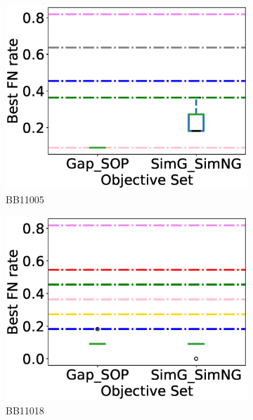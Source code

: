 \begin{figure}[!htbp]
\begin{adjustwidth}{-1cm}{-1cm}
\begin{subfigure}{0.26\textwidth}
			\includegraphics[width=\columnwidth]{Figure/summary/precomputedInit/Balibase/BB11005_objset_fnrate_rank}
			\caption{BB11005}
\end{subfigure}    
		\begin{subfigure}{0.26\textwidth}
			\includegraphics[width=\columnwidth]{Figure/summary/precomputedInit/Balibase/BB11018_objset_fnrate_rank}
			\caption{BB11018}
\end{subfigure}
		\begin{subfigure}{0.26\textwidth}

\end{subfigure}
\end{adjustwidth}
\end{figure}
